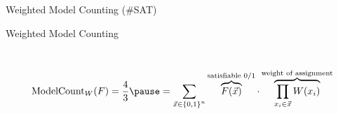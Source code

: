 \begin{frame}{Weighted Model Counting (\#SAT)}
\begin{example}{Weighted Model Counting}
\pause

  \vspace{.5em}
  ~\\
\[
\text{ModelCount}_W(F) = \frac 43 \pause = \sum_{\vec x\in \set{0,1}^n} \overbrace{F(\vec x)}^{\text{satisfiable 0/1}}  \cdot \overbrace{\prod_{x_i \in \vec x} W(x_i)}^{\text{weight of assignment}}
\]

\end{example}


\end{frame}





%
%
%
%
%
%
%
%
%
%
%
%



